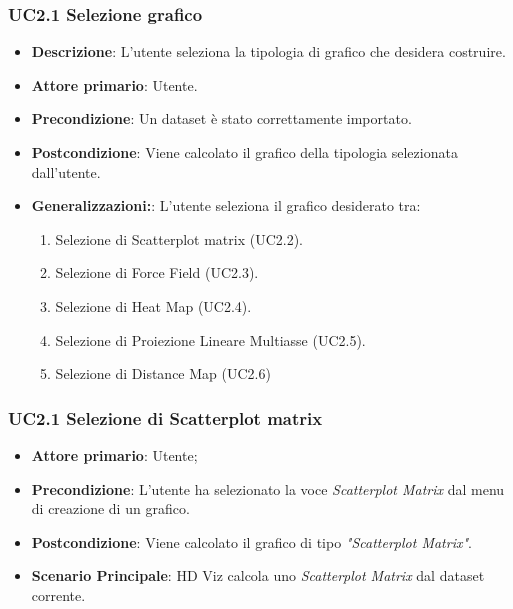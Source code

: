 \subsubsection{UC2.1 Selezione grafico}
\label{ssub:UC2.1}
\begin{itemize}

	\item \textbf{Descrizione}: L’utente seleziona la tipologia di grafico che desidera costruire.

    \item \textbf{Attore primario}: Utente.

	\item \textbf{Precondizione}:   Un dataset è stato correttamente importato. 
	
    \item \textbf{Postcondizione}:  Viene calcolato il grafico della tipologia selezionata dall'utente.

	\item \textbf{Generalizzazioni:}:  L'utente seleziona il grafico desiderato tra:

		\begin{enumerate}
			
			\item Selezione di Scatterplot matrix (UC2.2).
			\item Selezione di Force Field (UC2.3).
			\item Selezione di Heat Map (UC2.4).
			\item Selezione di Proiezione Lineare Multiasse (UC2.5).
			\item Selezione di Distance Map (UC2.6)
			
		\end{enumerate}

\end{itemize}


\subsubsection{UC2.1 Selezione di Scatterplot matrix}
\label{ssub:UC2.2}
\begin{itemize}

    \item \textbf{Attore primario}: Utente;

    \item \textbf{Precondizione}:   L'utente ha selezionato la voce \emph{Scatterplot Matrix} dal menu di creazione di un grafico.

    \item \textbf{Postcondizione}:  Viene calcolato il grafico di tipo \emph{"Scatterplot Matrix"}.

	\item \textbf{Scenario Principale}: HD Viz calcola uno \emph{Scatterplot Matrix} dal dataset corrente.
\end{itemize}


